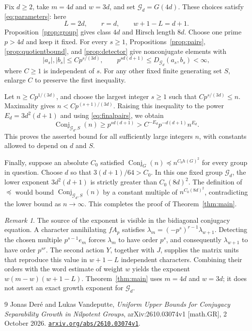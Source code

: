 \documentclass[11pt,letterpaper]{amsart}
\numberwithin{equation}{section}
\theoremstyle{remark}
\newtheorem{remark}[theorem]{Remark}
\newcommand{\Conj}{\operatorname{Conj}}
\newcommand{\Gp}{\mathcal G}
\begin{document}
Fix $d\ge2$, take $m=4d$ and $w=3d$, and set $\Gp_d=G(4d)$.
These choices satisfy \eqref{eq:parameters}: here
\[
 L=2d,\qquad r=d,\qquad w+1-L=d+1.
\]
Proposition~\ref{prop:group} gives class $4d$ and Hirsch length
$8d$. Choose one prime $p>4d$ and keep it fixed. For every $s\ge1$,
Propositions~\ref{prop:pairs}, \ref{prop:quotientbound}, and
\ref{prop:detector} give nonconjugate elements with
\begin{equation}\label{eq:finalpairs}
 |a_s|,|b_s|\le C p^{s/(3d)},\qquad
 p^{sd(d+1)}\le D_{\Gp_d}(a_s,b_s)<\infty,
\end{equation}
where $C\ge1$ is independent of $s$. For any other fixed finite
generating set $S$, enlarge $C$ to preserve the first inequality.

Let $n\ge C p^{1/(3d)}$, and choose the largest integer $s\ge1$
such that $C p^{s/(3d)}\le n$. Maximality gives
$n<Cp^{(s+1)/(3d)}$. Raising this inequality to the power
$E_d=3d^2(d+1)$ and using \eqref{eq:finalpairs}, we obtain
\[
 \Conj_{\Gp_d,S}(n)
 \ge p^{sd(d+1)}
 > C^{-E_d}p^{-d(d+1)}n^{E_d}.
\]
This proves the asserted bound for all sufficiently large integers
$n$, with constants allowed to depend on $d$ and $S$.

Finally, suppose an absolute $C_0$ satisfied
$\Conj_G(n)\preceq n^{C_0h(G)^2}$ for every group in question.
Choose $d$ so that $3(d+1)/64>C_0$. In this one fixed group
$\Gp_d$, the lower exponent $3d^2(d+1)$ is strictly greater than
$C_0(8d)^2$. The definition of $\preceq$ would bound
$\Conj_{\Gp_d,S}(n)$ by a constant multiple of
$n^{C_0(8d)^2}$, contradicting the lower bound as $n\to\infty$.
This completes the proof of Theorem~\ref{thm:main}.

\begin{remark}
The source of the exponent is visible in the bidiagonal conjugacy
equation. A character annihilating $fA_p$ satisfies
$\lambda_m=(-p^s)^{r-1}\lambda_{w+1}$. Detecting the chosen multiple
$p^{s-1}e_m$ forces $\lambda_m$ to have order $p^s$, and consequently
$\lambda_{w+1}$ to have order $p^{sr}$. The second action $Y$,
together with $J$, supplies the matrix units that reproduce this
value in $w+1-L$ independent characters. Combining their orders with
the word estimate of weight $w$ yields the exponent
$w(m-w)(w+1-L)$. Theorem~\ref{thm:main} uses
$m=4d$ and $w=3d$; it does not assert an exact growth exponent for
$\Gp_d$.
\end{remark}

\begin{thebibliography}{9}
Jonas Der\'e and Lukas Vandeputte,
\emph{Uniform Upper Bounds for Conjugacy Separability Growth in
Nilpotent Groups},
arXiv:2610.03074v1 [math.GR], 2 October 2026.
\href{https://arxiv.org/abs/2610.03074v1}{\texttt{arxiv.org/abs/2610.03074v1}}.
\end{thebibliography}
\end{document}
